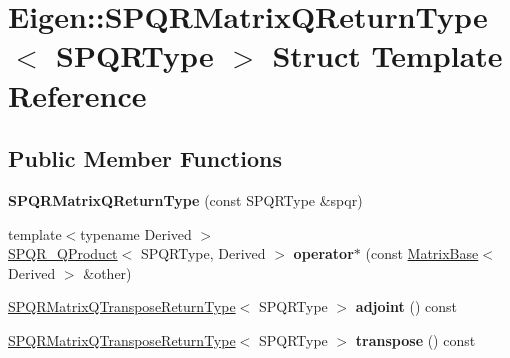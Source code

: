 \hypertarget{struct_eigen_1_1_s_p_q_r_matrix_q_return_type}{}\section{Eigen\+:\+:S\+P\+Q\+R\+Matrix\+Q\+Return\+Type$<$ S\+P\+Q\+R\+Type $>$ Struct Template Reference}
\label{struct_eigen_1_1_s_p_q_r_matrix_q_return_type}
\subsection*{Public Member Functions}
\begin{DoxyCompactItemize}
\item 
\mbox{\label{struct_eigen_1_1_s_p_q_r_matrix_q_return_type_a1879fa283850d7d9deaf7ba62c0410e7}} 
{\bfseries S\+P\+Q\+R\+Matrix\+Q\+Return\+Type} (const S\+P\+Q\+R\+Type \&spqr)
\item 
\mbox{\label{struct_eigen_1_1_s_p_q_r_matrix_q_return_type_a3ee436fdb285df3bf4cc13c93fc84048}} 
{\footnotesize template$<$typename Derived $>$ }\\\hyperlink{struct_eigen_1_1_s_p_q_r___q_product}{S\+P\+Q\+R\+\_\+\+Q\+Product}$<$ S\+P\+Q\+R\+Type, Derived $>$ {\bfseries operator$\ast$} (const \hyperlink{group___core___module_class_eigen_1_1_matrix_base}{Matrix\+Base}$<$ Derived $>$ \&other)
\item 
\mbox{\label{struct_eigen_1_1_s_p_q_r_matrix_q_return_type_a0465ee73e6f6740738db4b3aff2995de}} 
\hyperlink{struct_eigen_1_1_s_p_q_r_matrix_q_transpose_return_type}{S\+P\+Q\+R\+Matrix\+Q\+Transpose\+Return\+Type}$<$ S\+P\+Q\+R\+Type $>$ {\bfseries adjoint} () const
\item 
\mbox{\label{struct_eigen_1_1_s_p_q_r_matrix_q_return_type_a36141444649f6a785875777f8af9b366}} 
\hyperlink{struct_eigen_1_1_s_p_q_r_matrix_q_transpose_return_type}{S\+P\+Q\+R\+Matrix\+Q\+Transpose\+Return\+Type}$<$ S\+P\+Q\+R\+Type $>$ {\bfseries transpose} () const
\item 
\mbox{\label{struct_eigen_1_1_s_p_q_r_matrix_q_return_type_a1879fa283850d7d9deaf7ba62c0410e7}} 

\end{DoxyCompactItemize}
